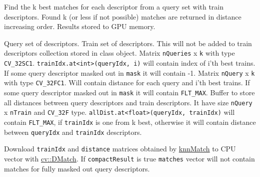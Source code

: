 \label{cppfunc.gpu.BruteForceMatcher.knnMatchSingle}
Find the k best matches for each descriptor from a query set with train descriptors. Found k (or less if not possible) matches are returned in distance increasing order. Results stored to GPU memory.
\begin{description}
 {Query set of descriptors.}
 {Train set of descriptors. This will not be added to train descriptors collection stored in class object.}
 {Matrix \texttt{nQueries} x \texttt{k} with type \texttt{CV\_32SC1}. \texttt{trainIdx.at<int>(queryIdx, i)} will contain index of i'th best trains. If some query descriptor masked out in \texttt{mask} it will contain -1.}
 {Matrix \texttt{nQuery} x \texttt{k} with type \texttt{CV\_32FC1}. Will contain distance for each query and i'th best trains. If some query descriptor masked out in \texttt{mask} it will contain \texttt{FLT\_MAX}.}
 {Buffer to store all distances between query descriptors and train descriptors. It have size \texttt{nQuery} x \texttt{nTrain} and \texttt{CV\_32F} type. \texttt{allDist.at<float>(queryIdx, trainIdx)} will contain \texttt{FLT\_MAX}, if \texttt{trainIdx} is one from k best, otherwise it will contain distance between \texttt{queryIdx} and \texttt{trainIdx} descriptors.}
\end{description}

\label{cppfunc.gpu.BruteForceMatcher.knnMatchDownload}
Download \texttt{trainIdx} and \texttt{distance} matrices obtained by \hyperref[cppfunc.gpu.BruteForceMatcher.knnMatchSingle]{knnMatch} to CPU vector with \hyperref[cv.class.DMatch]{cv::DMatch}. If \texttt{compactResult} is true \texttt{matches} vector will not contain matches for fully masked out query descriptors.

